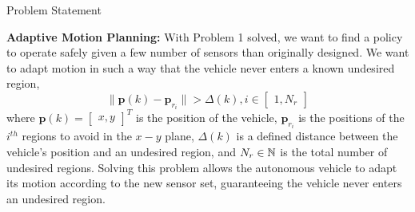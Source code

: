 \begin{section}{Problem Statement}
\begin{problem} \label{problem2} {\textbf{Adaptive Motion Planning:}}
With Problem 1 solved, we want to find a policy to operate safely given a few number of sensors than originally designed. We want to adapt motion in such a way that the vehicle never enters a known undesired region,
	\begin{equation}
		\lVert {\bm{p}(k)-\bm{p}_{r_i}} \rVert >\Delta(k),  i \in \begin{bmatrix} 1,N_r \end{bmatrix}
	\end{equation}
where $\bm{p}(k)={\begin{bmatrix} x,y \end{bmatrix}}^T$ is the position of the vehicle, $\bm{p}_{r_i}$ is the positions of the ${i}^{th}$ regions to avoid in the $x-y$ plane, $\Delta(k)$ is a defined distance between the vehicle's position and an undesired region, and $N_r \in \mathbb{N}$ is the total number of undesired regions. Solving this problem allows the autonomous vehicle to adapt its motion according to the new sensor set, guaranteeing the vehicle never enters an undesired region.


	
\end{problem}

\end{section}
